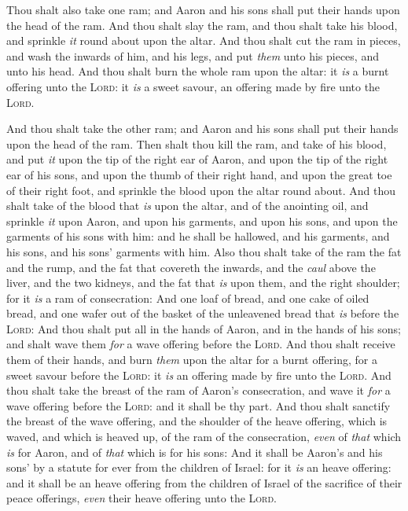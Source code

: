 \documentclass[11pt,letterpaper,oneside]{memoir}
\begin{document}
Thou shalt also take one ram; and Aaron and his sons shall put their
hands upon the head of the ram. And thou shalt slay the ram, and thou
shalt take his blood, and sprinkle \emph{it} round about upon the altar.
And thou shalt cut the ram in pieces, and wash the inwards of him, and
his legs, and put \emph{them} unto his pieces, and unto his head. And
thou shalt burn the whole ram upon the altar: it \emph{is} a burnt
offering unto the \textsc{Lord}: it \emph{is} a sweet savour, an
offering made by fire unto the \textsc{Lord}.

And thou shalt take the other ram; and Aaron and his sons shall put
their hands upon the head of the ram. Then shalt thou kill the ram, and
take of his blood, and put \emph{it} upon the tip of the right ear of
Aaron, and upon the tip of the right ear of his sons, and upon the thumb
of their right hand, and upon the great toe of their right foot, and
sprinkle the blood upon the altar round about. And thou shalt take of
the blood that \emph{is} upon the altar, and of the anointing oil, and
sprinkle \emph{it} upon Aaron, and upon his garments, and upon his sons,
and upon the garments of his sons with him: and he shall be hallowed,
and his garments, and his sons, and his sons' garments with him. Also
thou shalt take of the ram the fat and the rump, and the fat that
covereth the inwards, and the \emph{caul} above the liver, and the two
kidneys, and the fat that \emph{is} upon them, and the right shoulder;
for it \emph{is} a ram of consecration: And one loaf of bread, and one
cake of oiled bread, and one wafer out of the basket of the unleavened
bread that \emph{is} before the \textsc{Lord}: And thou shalt put all in
the hands of Aaron, and in the hands of his sons; and shalt wave them
\emph{for} a wave offering before the \textsc{Lord}. And thou shalt
receive them of their hands, and burn \emph{them} upon the altar for a
burnt offering, for a sweet savour before the \textsc{Lord}: it
\emph{is} an offering made by fire unto the \textsc{Lord}. And thou
shalt take the breast of the ram of Aaron's consecration, and wave it
\emph{for} a wave offering before the \textsc{Lord}: and it shall be thy
part. And thou shalt sanctify the breast of the wave offering, and the
shoulder of the heave offering, which is waved, and which is heaved up,
of the ram of the consecration, \emph{even} of \emph{that} which
\emph{is} for Aaron, and of \emph{that} which is for his sons: And it
shall be Aaron's and his sons' by a statute for ever from the children
of Israel: for it \emph{is} an heave offering: and it shall be an heave
offering from the children of Israel of the sacrifice of their peace
offerings, \emph{even} their heave offering unto the \textsc{Lord}.
\end{document}

